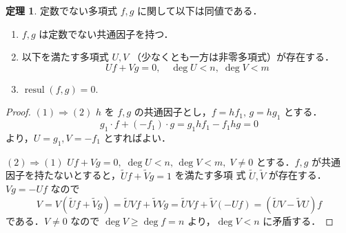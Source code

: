 \documentclass[12pt, uplatex, dvipdfmx]{jsarticle}
\theoremstyle{definition}
\newtheorem{theorem}{定理}
\DeclareMathOperator{\resul}{resul}
\begin{document}
\newpage

\begin{theorem}\label{thm:common-factor}
  定数でない多項式 $f,g$ に関して以下は同値である．
  \begin{enumerate}[(1)]
  \item $f, g$ は定数でない共通因子を持つ．%
  \item 以下を満たす多項式 $U, V$ （少なくとも一方は非零多項式）が存在する．
    \[
      Uf + Vg = 0, \quad \deg U <n, \; \deg V <m
    \]
  \item $\resul(f,g) = 0$.
  \end{enumerate}
\end{theorem}

\begin{proof}
  $(1) \Rightarrow (2)$ $h$ を $f,g$ の共通因子とし，$f=hf_1, \,
  g=hg_1$ とする．
  \[
    g_1 \cdot f + (-f_1) \cdot g = g_1  hf_1 - f_1 hg = 0
  \]
  より，$U=g_1, V=-f_1$ とすればよい．

  $(2) \Rightarrow (1)$
  $Uf+Vg=0, \; \deg U<n, \, \deg V<m, \; V \neq 0$ とする．$f,g$ が共通
  因子を持たないとすると，$\tilde{U}f+\tilde{V}g=1$ を満たす多項
  式 $\tilde{U}, \tilde{V}$ が存在する．$Vg = -Uf$ なので
  \[
    V = V(\tilde{U}f+\tilde{V}g) = \tilde{U}Vf + \tilde{V}Vg = \tilde{U}Vf + \tilde{V}(-Uf) = (\tilde{U}V - \tilde{V}U)f
  \]
  である．$V \neq 0$ なので $\deg V \geq \deg f = n$ より，$\deg V <n$ に矛盾する．


\end{proof}
\end{document}
